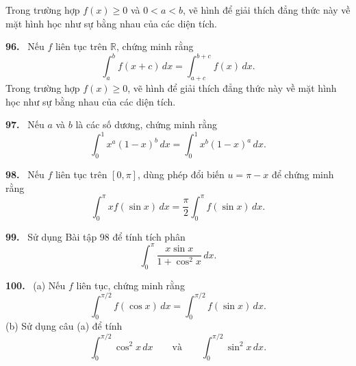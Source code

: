 \documentclass[12pt,a4paper]{article}
\newcommand{\bt}[1]{\par\smallskip\Needspace{5\baselineskip}\noindent\textbf{#1.}\ }
\begin{document}
Trong trường hợp $f(x)\ge0$ và $0<a<b$, vẽ hình để giải thích đẳng thức này về mặt hình học như sự bằng nhau của các diện tích.
\bt{96} Nếu $f$ liên tục trên $\mathbb R$, chứng minh rằng
\[\int_a^bf(x+c)\,dx=\int_{a+c}^{b+c}f(x)\,dx.\]
Trong trường hợp $f(x)\ge0$, vẽ hình để giải thích đẳng thức này về mặt hình học như sự bằng nhau của các diện tích.
\bt{97} Nếu $a$ và $b$ là các số dương, chứng minh rằng
\[\int_0^1x^a(1-x)^b\,dx=\int_0^1x^b(1-x)^a\,dx.\]
\bt{98} Nếu $f$ liên tục trên $[0,\pi]$, dùng phép đổi biến $u=\pi-x$ để chứng minh rằng
\[\int_0^\pi xf(\sin x)\,dx=\frac\pi2\int_0^\pi f(\sin x)\,dx.\]
\bt{99} Sử dụng Bài tập 98 để tính tích phân
\[\int_0^\pi\frac{x\sin x}{1+\cos^2x}\,dx.\]
\bt{100} (a) Nếu $f$ liên tục, chứng minh rằng
\[\int_0^{\pi/2}f(\cos x)\,dx=\int_0^{\pi/2}f(\sin x)\,dx.\]
\noindent(b) Sử dụng câu (a) để tính
\[\int_0^{\pi/2}\cos^2x\,dx\qquad\text{và}\qquad\int_0^{\pi/2}\sin^2x\,dx.\]
\end{document}
